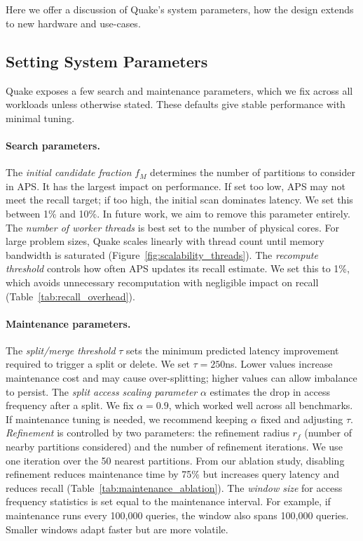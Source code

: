 \section{}

Here we offer a discussion of Quake’s system parameters, how the design extends to new hardware and use-cases.

\subsection{Setting System Parameters}
Quake exposes a few search and maintenance parameters, which we fix across all workloads unless otherwise stated. These defaults give stable performance with minimal tuning.

\paragraph{Search parameters.} The \textit{initial candidate fraction} $f_M$ determines the number of partitions to consider in APS. It has the largest impact on performance. If set too low, APS may not meet the recall target; if too high, the initial scan dominates latency. We set this between 1\% and 10\%. In future work, we aim to remove this parameter entirely. The \textit{number of worker threads} is best set to the number of physical cores. For large problem sizes, Quake scales linearly with thread count until memory bandwidth is saturated (Figure~\ref{fig:scalability_threads}). The \textit{recompute threshold} controls how often APS updates its recall estimate. We set this to 1\%, which avoids unnecessary recomputation with negligible impact on recall (Table~\ref{tab:recall_overhead}).

\paragraph{Maintenance parameters.} The \textit{split/merge threshold} $\tau$ sets the minimum predicted latency improvement required to trigger a split or delete. We set $\tau = 250$ns. Lower values increase maintenance cost and may cause over-splitting; higher values can allow imbalance to persist. The \textit{split access scaling parameter} $\alpha$ estimates the drop in access frequency after a split. We fix $\alpha = 0.9$, which worked well across all benchmarks. If maintenance tuning is needed, we recommend keeping $\alpha$ fixed and adjusting $\tau$. \textit{Refinement} is controlled by two parameters: the refinement radius $r_f$ (number of nearby partitions considered) and the number of refinement iterations. We use one iteration over the 50 nearest partitions. From our ablation study, disabling refinement reduces maintenance time by 75\% but increases query latency and reduces recall (Table~\ref{tab:maintenance_ablation}). The \textit{window size} for access frequency statistics is set equal to the maintenance interval. For example, if maintenance runs every 100{,}000 queries, the window also spans 100{,}000 queries. Smaller windows adapt faster but are more volatile.

